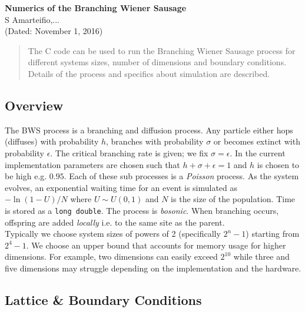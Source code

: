 \documentclass{article}
\date{\vspace{-5ex}}
\begin{document}
{\centering
	{\bfseries\Large Numerics of the Branching Wiener Sausage\bigskip}	
	\\S Amarteifio,...
		 \\
		\normalfont (Dated: November 1, 2016)	
	
}



\begin{abstract}
The C code can be used to run the Branching Wiener Sausage process for different systems sizes, number of dimensions and boundary conditions. Details of the process and specifics about simulation are described.
\end{abstract}

\begin{multicols}{2}

\section{Overview}

The BWS process is a branching and diffusion process. Any particle either hops (diffuses) with probability $h$, branches with probability $\sigma$ or becomes extinct with probability $\epsilon$. The critical branching rate is given; we fix $\sigma=\epsilon$. In the current implementation parameters are chosen such that $h+\sigma+\epsilon=1$ and $h$ is chosen to be high e.g. $0.95$. Each of these sub processes is a \textit{Poisson} process. As the system evolves, an exponential waiting time for an event is simulated as $-\ln(1-U)/N$ where $U\sim U(0,1)$ and $N$ is the size of the population. Time is stored as a \verb|long double|. The process is \textit{bosonic}. When branching occurs, offspring are added \textit{locally} i.e. to the same site as the parent. \\
Typically we choose system sizes of powers of 2 (specifically $2^n - 1$) starting from $2^4 - 1$. We choose an upper bound that accounts for memory usage for higher dimensions. For example, two dimensions can easily exceed $2^10$ while three and five dimensions may struggle depending on the implementation and the hardware.
\\

\subsection{Lattice \& Boundary Conditions}


\end{multicols}
\end{document}
